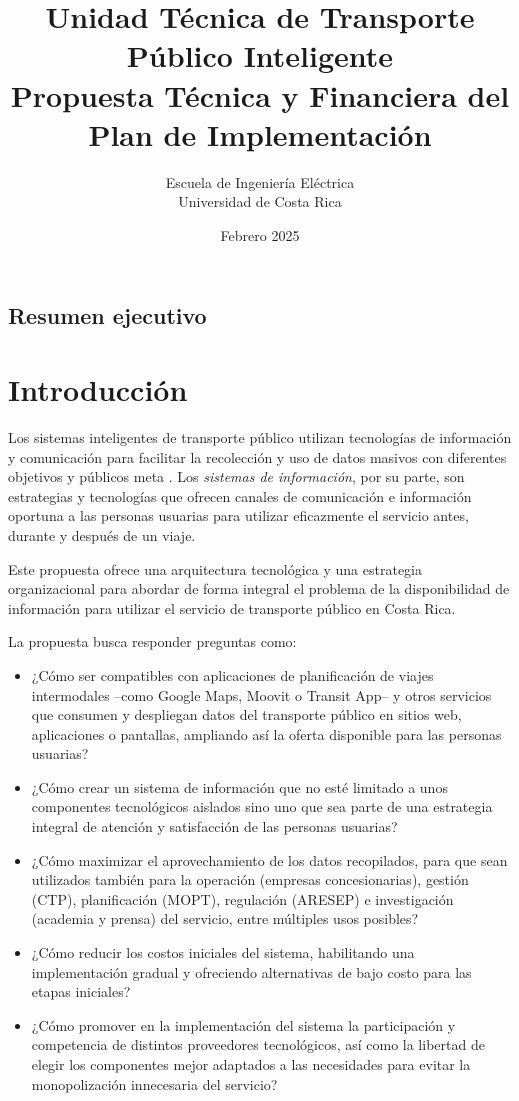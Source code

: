 \documentclass{report}
\title{Unidad Técnica de Transporte Público Inteligente \\ \large{Propuesta Técnica y Financiera del Plan de Implementación}}
\author{Escuela de Ingeniería Eléctrica \\ Universidad de Costa Rica}
\date{Febrero 2025}
\begin{document}

\maketitle

\section*{Resumen ejecutivo}

\tableofcontents

\chapter{Introducción}

Los sistemas inteligentes de transporte público utilizan tecnologías de información y comunicación para facilitar la recolección y uso de datos masivos con diferentes objetivos y públicos meta \cite{visan2022towards}. Los \textit{sistemas de información}, por su parte, son estrategias y tecnologías que ofrecen canales de comunicación e información oportuna a las personas usuarias para utilizar eficazmente el servicio \cite{barfield1998human} antes, durante y después de un viaje. 

Este propuesta ofrece una arquitectura tecnológica y una estrategia organizacional para abordar de forma integral el problema de la disponibilidad de información para utilizar el servicio de transporte público en Costa Rica.

La propuesta busca responder preguntas como:

\begin{itemize}
    \item ¿Cómo ser compatibles con aplicaciones de planificación de viajes intermodales --como Google Maps, Moovit o Transit App-- y otros servicios que consumen y despliegan datos del transporte público en sitios web, aplicaciones o pantallas, ampliando así la oferta disponible para las personas usuarias?
    \item ¿Cómo crear un sistema de información que no esté limitado a unos componentes tecnológicos aislados sino uno que sea parte de una estrategia integral de atención y satisfacción de las personas usuarias?
    \item ¿Cómo maximizar el aprovechamiento de los datos recopilados, para que sean utilizados también para la operación (empresas concesionarias), gestión (CTP), planificación (MOPT), regulación (ARESEP) e investigación (academia y prensa) del servicio, entre múltiples usos posibles?
    \item ¿Cómo reducir los costos iniciales del sistema, habilitando una implementación gradual y ofreciendo alternativas de bajo costo para las etapas iniciales?
    \item ¿Cómo promover en la implementación del sistema la participación y competencia de distintos proveedores tecnológicos, así como la libertad de elegir los componentes mejor adaptados a las necesidades para evitar la monopolización innecesaria del servicio?
\end{itemize}
\end{document}
